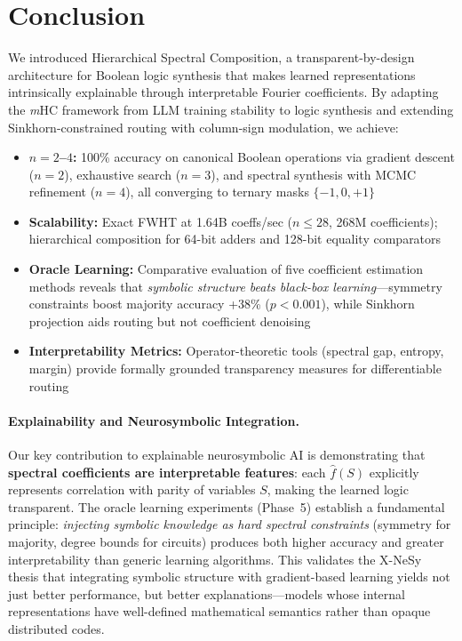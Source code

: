 \documentclass[Royal,times,sageh]{sagej}
\newcommand{\mHC}{\textit{m}HC}
\begin{document}
\section{Conclusion}

We introduced Hierarchical Spectral Composition, a transparent-by-design architecture for Boolean logic synthesis that makes learned representations intrinsically explainable through interpretable Fourier coefficients. By adapting the \mHC{} framework \cite{xie2024mhc} from LLM training stability to logic synthesis and extending Sinkhorn-constrained routing with column-sign modulation, we achieve:

\begin{itemize}
    \item \textbf{$n=2$--$4$:} 100\% accuracy on canonical Boolean operations via gradient descent ($n=2$), exhaustive search ($n=3$), and spectral synthesis with MCMC refinement ($n=4$), all converging to ternary masks $\{-1,0,+1\}$
    \item \textbf{Scalability:} Exact FWHT at 1.64B coeffs/sec ($n \leq 28$, 268M coefficients); hierarchical composition for 64-bit adders and 128-bit equality comparators
    \item \textbf{Oracle Learning:} Comparative evaluation of five coefficient estimation methods reveals that \textit{symbolic structure beats black-box learning}---symmetry constraints boost majority accuracy +38\% ($p < 0.001$), while Sinkhorn projection aids routing but not coefficient denoising
    \item \textbf{Interpretability Metrics:} Operator-theoretic tools (spectral gap, entropy, margin) provide formally grounded transparency measures for differentiable routing
\end{itemize}

\paragraph{Explainability and Neurosymbolic Integration.} Our key contribution to explainable neurosymbolic AI is demonstrating that \textbf{spectral coefficients are interpretable features}: each $\hat{f}(S)$ explicitly represents correlation with parity of variables $S$, making the learned logic transparent. The oracle learning experiments (Phase~5) establish a fundamental principle: \textit{injecting symbolic knowledge as hard spectral constraints} (symmetry for majority, degree bounds for circuits) produces both higher accuracy and greater interpretability than generic learning algorithms. This validates the X-NeSy thesis that integrating symbolic structure with gradient-based learning yields not just better performance, but better explanations---models whose internal representations have well-defined mathematical semantics rather than opaque distributed codes.
\end{document}
